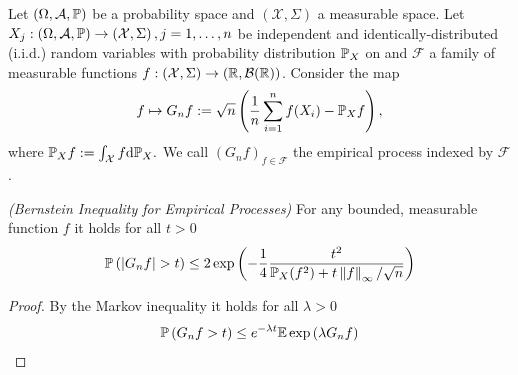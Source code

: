 
Let 
$
  \left( 
    \Omega,
    \mathcal{A},
    \P
  \right)
$
be a probability space
and
$
  \left( 
    \mathcal{X},
    \Sigma
  \right)
$
a measurable space.
Let 
$
  X_j
  :
  \left( 
    \Omega,
    \mathcal{A},
    \P
  \right)
  \to
  \left( 
    \mathcal{X},
    \Sigma
  \right)
  ,
  j=1,\ldots, n
$ be independent and identically-distributed (i.i.d.)
random variables
with probability distribution $\P_X$ on
and
$\mathcal{F}$ a family of measurable functions
$
  f:
  \left( 
    \mathcal{X},
    \Sigma
  \right)
    \to
  \left( 
    \R,
    \mathcal{B}(\R)
  \right)
$.
Consider the map
\begin{gather}
  f
  \mapsto
  G_n f
  :=
  \sqrt{n}
  \left( 
    \frac{1}{n}
    \sum_{i = 1}^{n}
      f(X_i)
    -
    \P_X f
  \right),
\end{gather}
where
$
  \P_X f 
  :=
  \int_\mathcal{X} f \text{d}\P_X.
$
We call 
$
  \left( 
    G_n f
  \right)_{f \in \mathcal{F}}
$
the empirical process indexed by $\mathcal{F}$.

\begin{lemma}
  \emph{(Bernstein Inequality for Empirical Processes)}
  For any bounded, measurable function $f$
  it holds for all $t > 0$
  \begin{gather}
    \P 
    \left(
      \left| 
        G_n f
      \right|
      >
      t
    \right)
    \le
    2
    \exp
    \left( 
      - \frac{1}{4}
      \frac{t^2}
      {
        \P_X(f^2)
        +
        t
        \norm{f}_\infty
        /
        \sqrt{n}
      }
    \right)
  \end{gather}
\end{lemma}
\begin{proof}
  By the Markov inequality it holds for all $\lambda > 0$
  \begin{gather}
    \P
    \left( 
      G_n f 
      > 
      t
    \right)
    \le
    e^{-\lambda t}
    \E
    \exp
    \left( 
      \lambda
      G_n f 
    \right)
  \end{gather}
\end{proof}

